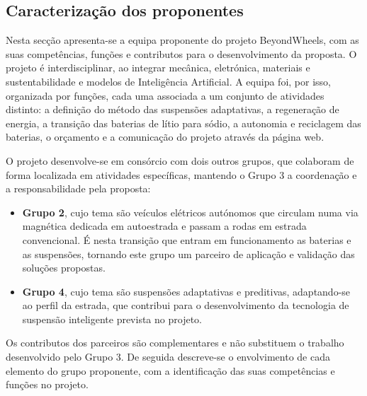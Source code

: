 \subsection{Caracterização dos proponentes}
\begin{campotexto}
Nesta secção apresenta-se a equipa proponente do projeto BeyondWheels, com as
suas competências, funções e contributos para o desenvolvimento da proposta. O
projeto é interdisciplinar, ao integrar mecânica, eletrónica, materiais e
sustentabilidade e modelos de Inteligência Artificial. A
equipa foi, por isso, organizada por funções, cada uma associada a um conjunto
de atividades distinto: a definição do método das suspensões adaptativas, a
regeneração de energia, a transição das baterias de lítio para sódio, a
autonomia e reciclagem das baterias, o orçamento e a comunicação do projeto
através da página web.

O projeto desenvolve-se em consórcio com dois outros grupos, que colaboram de
forma localizada em atividades específicas, mantendo o Grupo 3 a coordenação e
a responsabilidade pela proposta:
\begin{itemize}
  \item \textbf{Grupo 2}, cujo tema são veículos elétricos autónomos que
  circulam numa via magnética dedicada em autoestrada e passam a rodas em
  estrada convencional. É nesta transição que entram em funcionamento as
  baterias e as suspensões, tornando este grupo um parceiro de aplicação e
  validação das soluções propostas.
  \item \textbf{Grupo 4}, cujo tema são suspensões adaptativas e preditivas, adaptando-se ao perfil da estrada,
  que contribui para o desenvolvimento da tecnologia de suspensão inteligente
  prevista no projeto.
\end{itemize}

Os contributos dos parceiros são complementares e não substituem o trabalho
desenvolvido pelo Grupo 3. De seguida descreve-se o envolvimento de cada
elemento do grupo proponente, com a identificação das suas competências e
funções no projeto.
\end{campotexto}

\newcommand{\tabelaElemento}[5]{%
  \begin{table}[H]
  \centering\small
  \begin{tabularx}{\textwidth}{L{0.32\textwidth} Y}
    \toprule
    \rowcolor{uatablehead}
    \multicolumn{2}{l}{\sffamily\bfseries\color{uadark} #1} \\
    \midrule
    \sffamily\bfseries Identificação & #2 \\ \arrayrulecolor{uaborder}\hline
    \sffamily\bfseries Competências & #3 \\ \hline
    \sffamily\bfseries Funções no projeto & #4 \\ \hline
    \sffamily\bfseries Envolvimento no desenvolvimento da proposta (tópicos e percentagem global) & #5 \\
    \arrayrulecolor{black}\bottomrule
  \end{tabularx}
  \end{table}
}

